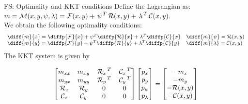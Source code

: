 \documentclass{beamer}
\newcommand{\R}{\mathcal{R}}
\newcommand{\F}{\mathcal{F}}
\newcommand{\C}{\mathcal{C}}
\newcommand{\Mm}{\mathcal{M}}
\begin{document}
  \begin{frame}{FS: Optimality and KKT conditions}
    Define the Lagrangian as:
    \vspace{2mm}
    \\ $m = \Mm(x, y, \psi, \lambda) = \F(x, y) + \T{\psi} \R(x,y) + \T{\lambda} \C(x,y)$. 
    \vspace{2mm}
    \\We obtain the following optimality conditions:
\begin{equation*} %
    \begin{array}{l l}
    \diff{m}{x} = \diffp{\F}{x} + \psi^T \diffp{\R}{x} + \lambda^T \diffp{\C}{x}
    & \diff{m}{\psi} = \R(x,y)\\
    \diff{m}{y} = \diffp{\F}{y} + \psi^T \diffp{\R}{y} + \lambda^T \diffp{\C}{y}
    & \diff{m}{\lambda} = \C(x,y)
    
    \end{array}
    \label{eq:fs_opt}
\end{equation*}
The KKT system is given by

\begin{equation*} %
    \begin{bmatrix}
        m_{xx} & m_{xy} &  \T{\R_x}  &  \T{\C_x} \\
        m_{yx} & m_{yy} &  \T{\R_y}  &  \T{\C_y} \\
         \R_x  &  \R_y & 0 & 0\\
         \C_x  &  \C_y & 0 & 0\\
    \end{bmatrix}
    \begin{bmatrix}
        p_x \\
        p_y \\
        p_{\psi} \\
        p_{\lambda} \\
    \end{bmatrix}
    =
    \begin{bmatrix}
        -m_x \\ 
        -m_y \\ 
        -\R(x,y) \\
        -\C(x,y) \\
    \end{bmatrix}
    \label{eq:fs_kkt}
\end{equation*}
  \end{frame}
\end{document}
